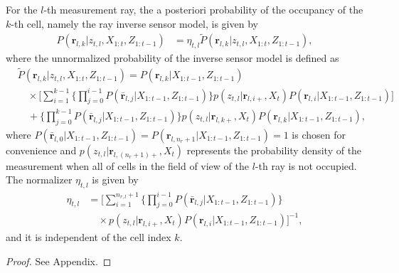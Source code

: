 \begin{prop}
For the $l$-th measurement ray, the a posteriori probability of the occupancy of the $k$-th cell, namely the ray inverse sensor model, is given by
\begin{align}
\label{eqn:RayISMAnswer}
P(\mathbf{r}_{l,k}|z_{t,l},X_{1:t},Z_{1:t-1})&=\eta_{t,l}\tilde P(\mathbf{r}_{l,k}|z_{t,l},X_{1:t},Z_{1:t-1}),
\end{align}
where the unnormalized probability of the inverse sensor model is defined as
\begin{align}
\label{eqn:Unnormalized}
& \tilde P(\mathbf{r}_{l,k}|z_{t,l},X_{1:t},Z_{1:t-1})%
=P(\mathbf{r}_{l,k}|X_{1:t-1},Z_{1:t-1})\nonumber\\
&\quad\times 
\bigg[\sum_{i=1}^{k-1}\bigg\{\prod_{j=0}^{i-1}P(\bar{\mathbf{r}}_{l,j}|X_{1:t-1},Z_{1:t-1})\bigg\}%
p(z_{t,l}|\mathbf{r}_{l,i+},X_t)P(\mathbf{r}_{l,i}|X_{1:t-1},Z_{1:t-1})\bigg]\nonumber\\
&\quad + \bigg\{\prod_{j=0}^{k-1}P(\bar{\mathbf{r}}_{l,j}|X_{1:t-1},Z_{1:t-1})\bigg\}%
p(z_{t,l}|\mathbf{r}_{l,k+},X_t)P(\mathbf{r}_{l,k}|X_{1:t-1},Z_{1:t-1}),
\end{align}
where $P(\bar{\mathbf{r}}_{l,0}|X_{1:t-1},Z_{1:t-1})=P(\mathbf{r}_{l,n_r+1}|X_{1:t-1},Z_{1:t-1})=1$ is chosen for convenience and $p(z_{t,l}|\mathbf{r}_{l,(n_r+1)+},X_t)$ represents the probability density of the measurement when all of cells in the field of view of the $l$-th ray is not occupied. The normalizer $\eta_{t,l}$ is given by
\begin{align}
\label{eqn:allEta}
\eta_{t,l}
&=
\bigg[\sum_{i=1}^{n_{r,l}+1}\bigg\{\prod_{j=0}^{i-1}P(\bar{\mathbf{r}}_{l,j}|X_{1:t-1},Z_{1:t-1})\bigg\}\nonumber\\&\quad\times p(z_{t,l}|\mathbf{r}_{l,i+},X_t)P(\mathbf{r}_{l,i}|X_{1:t-1},Z_{1:t-1})\bigg]^{-1},
\end{align}
and it is independent of the cell index $k$.
\end{prop}
\begin{proof}
See Appendix.
\end{proof}


